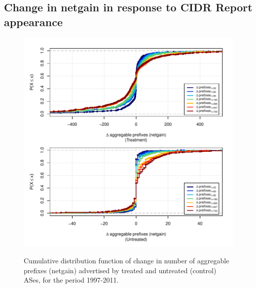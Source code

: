 \subsection{Change in netgain in response to CIDR Report appearance}

\begin{figure}[H]
\begin{centering}
\begin{singlespace}
    \includegraphics[width=6in]{figures/behavior-netgain-1997_2011-corr.pdf}
    \vspace{-2em}\\
    \caption{Cumulative distribution function of change in number of aggregable
    prefixes (netgain) advertised by treated and untreated (control) ASes, for
    the period 1997-2011.}
\end{singlespace}
\end{centering}
\end{figure}

